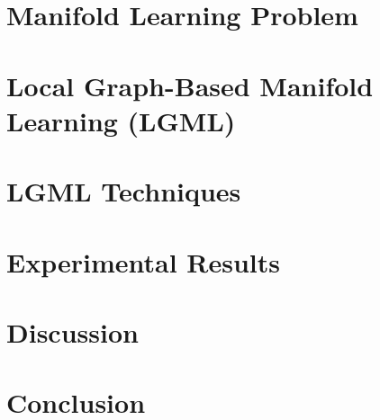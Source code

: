 \documentclass[12pt, t]{article}
\begin{document}
\section{Manifold Learning Problem}
\label{math}


\section{Local Graph-Based Manifold Learning (LGML)}
\label{lgml}


\section{LGML Techniques}
\label{techniques}


% 

\section{Experimental Results}
\label{experiment}


\section{Discussion}
\label{discussion}


\section{Conclusion}
\label{concl}


\newpage

    


\setcounter{page}{5}
\end{document}
